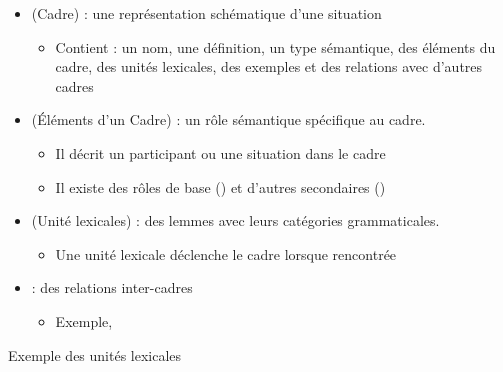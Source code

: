 \documentclass{KodeBook}
\begin{document}
\begin{itemize}
	\item {} (Cadre) : une représentation schématique d'une situation
	\begin{itemize}
		\item Contient : un nom, une définition, un type sémantique, des éléments du cadre, des unités lexicales, des exemples et des relations avec d'autres cadres
	\end{itemize}
	
	\item {} (Éléments d'un Cadre) : un rôle sémantique spécifique au cadre. 
	\begin{itemize}
		\item Il décrit un participant ou une situation dans le cadre
		\item Il existe des rôles de base () et d'autres secondaires ()
	\end{itemize}
	
	\item {} (Unité lexicales) : des lemmes avec leurs catégories grammaticales.
	\begin{itemize}
		\item Une unité lexicale déclenche le cadre lorsque rencontrée
	\end{itemize}
	
	\item {} : des  relations inter-cadres
	\begin{itemize}
		\item Exemple, 
	\end{itemize}
\end{itemize}

Exemple des unités lexicales
\end{document}
